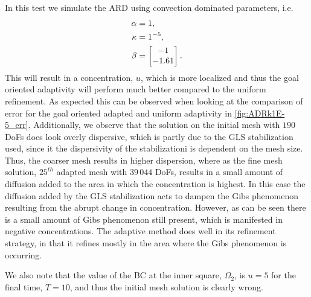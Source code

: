 \begin{test}[Convection Dominated ARD, $\kappa = 1\times10^{-5}$] \label{tst:ADRk1E-5}
    In this test we simulate the ARD using convection dominated parameters, i.e.
    \begin{align*}
        \alpha &= 1, \\
        \kappa &= 1\time 10^{-5}, \\
        \beta &= \begin{bmatrix} -1 \\ -1.61 \end{bmatrix}.
    \end{align*}
    This will result in a concentration, $u$, which is more localized and thus
    the goal oriented adaptivity will perform much better compared to the
    uniform refinement.  As expected this can be observed when looking at the
    comparison of error for the goal oriented adapted and uniform adaptivity in
    \autoref{fig:ADRk1E-5_err}. Additionally, we observe that the solution on
    the initial mesh with $190$ DoFs does look overly dispersive, which is
    partly due to the GLS stabilization used, since it the dispersivity of the
    stabilizationi is dependent on the mesh size. Thus, the coarser mesh results
    in higher dispersion, where as the fine mesh solution, $25^{th}$ adapted
    mesh with $39\, 044$ DoFs, results in a small amount of diffusion added to
    the area in which the concentration is highest. In this case the diffusion
    added by the GLS stabilization acts to dampen the Gibs phenomenon resulting
    from the abrupt change in concentration. However, as can be seen there is a
    small amount of Gibs phenomenon still present, which is manifested in
    negative concentrations. The adaptive method does well in its refinement
    strategy, in that it refines mostly in the area where the Gibs phenomenon
    is occurring.

    We also note that the value of the BC at the inner square, $\Omega_2$, is
    $u = 5$ for the final time, $T=10$, and thus the initial mesh solution is
    clearly wrong.


\end{test}

